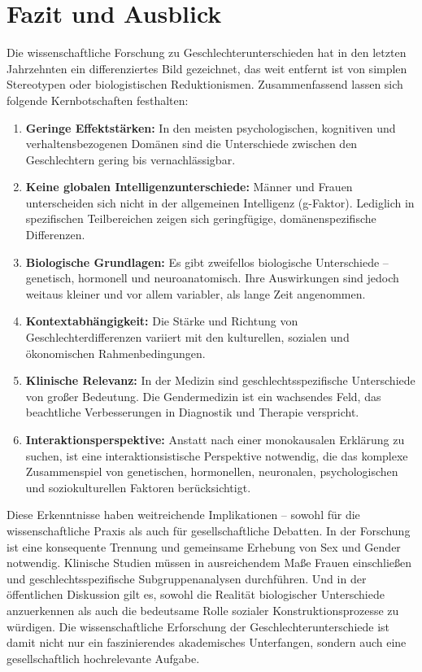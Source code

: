 \documentclass[12pt,a4paper]{article}
\begin{document}
	\section{Fazit und Ausblick}
	Die wissenschaftliche Forschung zu Geschlechterunterschieden hat in den letzten Jahrzehnten ein differenziertes Bild gezeichnet, das weit entfernt ist von simplen Stereotypen oder biologistischen Reduktionismen. Zusammenfassend lassen sich folgende Kernbotschaften festhalten:
	\begin{enumerate}
		\item \textbf{Geringe Effektstärken:} In den meisten psychologischen, kognitiven und verhaltensbezogenen Domänen sind die Unterschiede zwischen den Geschlechtern gering bis vernachlässigbar. \cite{DWDS}
		\item \textbf{Keine globalen Intelligenzunterschiede:} Männer und Frauen unterscheiden sich nicht in der allgemeinen Intelligenz (g-Faktor). Lediglich in spezifischen Teilbereichen zeigen sich geringfügige, domänenspezifische Differenzen. \cite{Giofre2022}
		\item \textbf{Biologische Grundlagen:} Es gibt zweifellos biologische Unterschiede -- genetisch, hormonell und neuroanatomisch. Ihre Auswirkungen sind jedoch weitaus kleiner und vor allem variabler, als lange Zeit angenommen.
		\item \textbf{Kontextabhängigkeit:} Die Stärke und Richtung von Geschlechterdifferenzen variiert mit den kulturellen, sozialen und ökonomischen Rahmenbedingungen. \cite{Herlitz2025}
		\item \textbf{Klinische Relevanz:} In der Medizin sind geschlechtsspezifische Unterschiede von großer Bedeutung. Die Gendermedizin ist ein wachsendes Feld, das beachtliche Verbesserungen in Diagnostik und Therapie verspricht. \cite{NatureDiseases2024}
		\item \textbf{Interaktionsperspektive:} Anstatt nach einer monokausalen Erklärung zu suchen, ist eine interaktionsistische Perspektive notwendig, die das komplexe Zusammenspiel von genetischen, hormonellen, neuronalen, psychologischen und soziokulturellen Faktoren berücksichtigt.
	\end{enumerate}
	Diese Erkenntnisse haben weitreichende Implikationen -- sowohl für die wissenschaftliche Praxis als auch für gesellschaftliche Debatten. In der Forschung ist eine konsequente Trennung und gemeinsame Erhebung von Sex und Gender notwendig. Klinische Studien müssen in ausreichendem Maße Frauen einschließen und geschlechtsspezifische Subgruppenanalysen durchführen. Und in der öffentlichen Diskussion gilt es, sowohl die Realität biologischer Unterschiede anzuerkennen als auch die bedeutsame Rolle sozialer Konstruktionsprozesse zu würdigen. Die wissenschaftliche Erforschung der Geschlechterunterschiede ist damit nicht nur ein faszinierendes akademisches Unterfangen, sondern auch eine gesellschaftlich hochrelevante Aufgabe.
	
\end{document}
